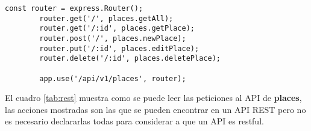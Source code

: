 \begin{center}
  \begin{lstlisting}[label=express_api,caption=Declarando API REST con ExpressJS]
        const router = express.Router();
        router.get('/', places.getAll);
        router.get('/:id', places.getPlace);
        router.post('/', places.newPlace);
        router.put('/:id', places.editPlace);
        router.delete('/:id', places.deletePlace);

        app.use('/api/v1/places', router);
  \end{lstlisting}
\end{center}




  El cuadro \ref{tab:rest} muestra como se puede leer las peticiones al API de \textbf{places}, las acciones mostradas son las que se pueden encontrar en un API REST pero no es necesario declararlas todas para considerar a que un API es restful.\\


